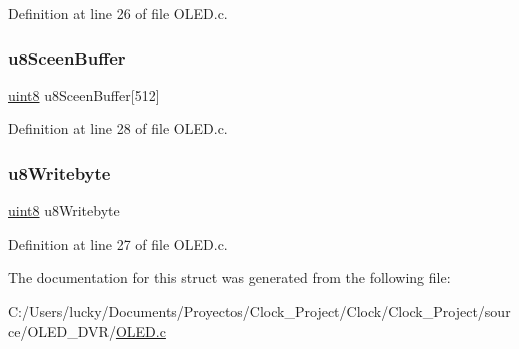 Definition at line 26 of file O\+L\+E\+D.\+c.

\mbox{\label{struct_o_l_e_d__st_draw_msg_af658d123a34c470b9070e5901de4bc40}} 
\subsubsection{\texorpdfstring{u8SceenBuffer}{u8SceenBuffer}}
{\footnotesize\ttfamily \mbox{\hyperlink{_p_i_t_8h_adde6aaee8457bee49c2a92621fe22b79}{uint8}} u8\+Sceen\+Buffer\mbox{[}512\mbox{]}}



Definition at line 28 of file O\+L\+E\+D.\+c.

\mbox{\label{struct_o_l_e_d__st_draw_msg_a065572928972e30875485dcf81db66ef}} 
\subsubsection{\texorpdfstring{u8Writebyte}{u8Writebyte}}
{\footnotesize\ttfamily \mbox{\hyperlink{_p_i_t_8h_adde6aaee8457bee49c2a92621fe22b79}{uint8}} u8\+Writebyte}



Definition at line 27 of file O\+L\+E\+D.\+c.



The documentation for this struct was generated from the following file\+:\begin{DoxyCompactItemize}
\item 
C\+:/\+Users/lucky/\+Documents/\+Proyectos/\+Clock\+\_\+\+Project/\+Clock/\+Clock\+\_\+\+Project/source/\+O\+L\+E\+D\+\_\+\+D\+V\+R/\mbox{\hyperlink{_o_l_e_d_8c}{O\+L\+E\+D.\+c}}\end{DoxyCompactItemize}
